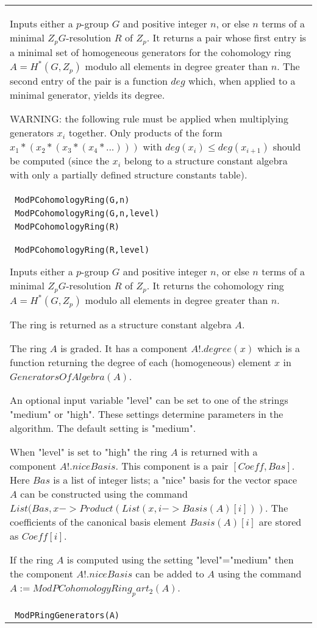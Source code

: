 \documentclass[a4paper,11pt]{report}
\begin{document}
{\begin{center}
\begin{tabular}{|l|}
 Inputs either a $p$-group $G$ and positive integer $n$, or else $n$ terms of a minimal $Z_pG$-resolution $R$ of $Z_p$. It returns a pair whose first entry is a minimal set of homogeneous
generators for the cohomology ring $A=H^*(G,Z_p)$ modulo all elements in degree greater than $n$. The second entry of the pair is a function $deg$ which, when applied to a minimal generator, yields its degree. 

 WARNING: the following rule must be applied when multiplying generators $x_i$ together. Only products of the form $x_1*(x_2*(x_3*(x_4*...)))$ with $deg(x_i) \le deg(x_{i+1})$ should be computed (since the $x_i$ belong to a structure constant algebra with only a partially defined structure
constants table). \\
 \index{ModPCohomologyRing} \texttt{ ModPCohomologyRing(G,n) } \\
 \texttt{ ModPCohomologyRing(G,n,level) } \\
 \texttt{ ModPCohomologyRing(R) } \\
 \texttt{ ModPCohomologyRing(R,level) } 

 Inputs either a $p$-group $G$ and positive integer $n$, or else $n$ terms of a minimal $Z_pG$-resolution $R$ of $Z_p$. It returns the cohomology ring $A=H^*(G,Z_p)$ modulo all elements in degree greater than $n$. 

 The ring is returned as a structure constant algebra $A$. 

 The ring $A$ is graded. It has a component $A!.degree(x)$ which is a function returning the degree of each (homogeneous) element $x$ in $GeneratorsOfAlgebra(A)$. 

 An optional input variable "level" can be set to one of the strings "medium"
or "high". These settings determine parameters in the algorithm. The default
setting is "medium". 

 When "level" is set to "high" the ring $A$ is returned with a component $A!.niceBasis$. This component is a pair $[Coeff,Bas]$. Here $Bas$ is a list of integer lists; a "nice" basis for the vector space $A$ can be constructed using the command $List(Bas,x->Product(List(x,i->Basis(A)[i]))$. The coefficients of the canonical basis element $Basis(A)[i]$ are stored as $Coeff[i]$. 

 If the ring $A$ is computed using the setting "level"="medium" then the component $A!.niceBasis$ can be added to $A$ using the command $ A:=ModPCohomologyRing_part_2(A) $. \\
 \index{ModPRingGenerators} \texttt{ ModPRingGenerators(A) } 


\end{tabular}
\end{center}}
\end{document}
